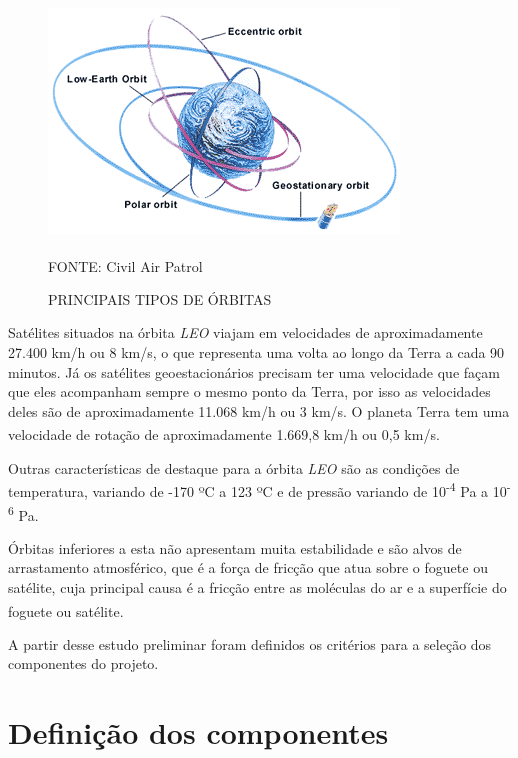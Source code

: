 \documentclass[
	12pt,				%
	openright,			%
	oneside,			%
	a4paper,			%
	english,			%
	french,				%
	spanish,			%
	brazil,				%
	oldfontcommands
	]{abntex2}
\begin{document}
	\begin{figure}[th]
		\caption{PRINCIPAIS TIPOS DE ÓRBITAS}
		\label{Fig_Orbitas}
		\centering
		\includegraphics[width=0.65\linewidth]{./figs/cubesat_03}
			
		\begin{small}
			FONTE: Civil Air Patrol\textsuperscript{\cite{CAP}}
		\end{small}		
	\end{figure}
	
	Satélites situados na órbita \textit{LEO} viajam em velocidades de aproximadamente 27.400 km/h ou 8 km/s, o que representa uma volta ao longo da Terra a cada 90 minutos. Já os satélites geoestacionários precisam ter uma velocidade que façam que eles acompanham sempre o mesmo ponto da Terra, por isso as velocidades deles são de aproximadamente 11.068 km/h ou 3 km/s. O planeta Terra tem uma velocidade de rotação de aproximadamente 1.669,8 km/h ou 0,5 km/s.\textsuperscript{\cite{LEO}}\textsuperscript{\cite{GEO}}
	
	Outras características de destaque para a órbita \textit{LEO} são as condições de temperatura, variando de -170 ºC a 123 ºC e de pressão variando de 10\textsuperscript{-4} Pa a 10\textsuperscript{-6} Pa.\textsuperscript{\cite{LEO}}
	
	Órbitas inferiores a esta não apresentam muita estabilidade e são alvos de arrastamento atmosférico, que é a força de fricção que atua sobre o foguete ou satélite, cuja principal causa é a fricção entre as moléculas do ar e a superfície do foguete ou satélite.\textsuperscript{\cite{NASA2}}
	
	A partir desse estudo preliminar foram definidos os critérios para a seleção dos componentes do projeto.	
	
\section[Definição dos componentes]{Definição dos componentes}
\end{document}
